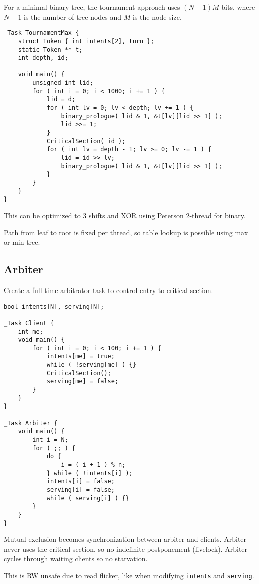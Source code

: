 \documentclass[11pt]{article}
\begin{document}
For a minimal binary tree, the tournament approach uses \((N-1)M\) bits, where \(N-1\) is the
number of tree nodes and \(M\) is the node size.
\begin{verbatim}
_Task TournamentMax {
    struct Token { int intents[2], turn };
    static Token ** t;
    int depth, id;

    void main() {
        unsigned int lid;
        for ( int i = 0; i < 1000; i += 1 ) {
            lid = d;
            for ( int lv = 0; lv < depth; lv += 1 ) {
                binary_prologue( lid & 1, &t[lv][lid >> 1] );
                lid >>= 1;
            }
            CriticalSection( id );
            for ( int lv = depth - 1; lv >= 0; lv -= 1 ) {
                lid = id >> lv;
                binary_prologue( lid & 1, &t[lv][lid >> 1] );
            }
        }
    }
}
\end{verbatim}

This can be optimized to 3 shifts and XOR using Peterson 2-thread for binary.

Path from leaf to root is fixed per thread, so table lookup is possible using max or
min tree.
\subsection{Arbiter}
\label{sec:org67f086b}
Create a full-time arbitrator task to control entry to critical section.
\begin{verbatim}
bool intents[N], serving[N];

_Task Client {
    int me;
    void main() {
        for ( int i = 0; i < 100; i += 1 ) {
            intents[me] = true;
            while ( !serving[me] ) {}
            CriticalSection();
            serving[me] = false;
        }
    }
}

_Task Arbiter {
    void main() {
        int i = N;
        for ( ;; ) {
            do {
                i = ( i + 1 ) % n;
            } while ( !intents[i] );
            intents[i] = false;
            serving[i] = false;
            while ( serving[i] ) {}
        }
    }
}
\end{verbatim}

Mutual exclusion becomes synchronization between arbiter and clients.
Arbiter never uses the critical section, so no indefinite postponement (livelock).
Arbiter cycles through waiting clients so no starvation.

This is RW unsafe due to read flicker, like when modifying \texttt{intents} and \texttt{serving}.
\end{document}
